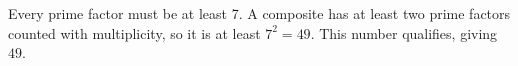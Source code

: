 Every prime factor must be at least 7. A composite has at least two prime factors counted with multiplicity, so it is at least $ 7^2=49 $. This number qualifies, giving $\boxed{49}$.
